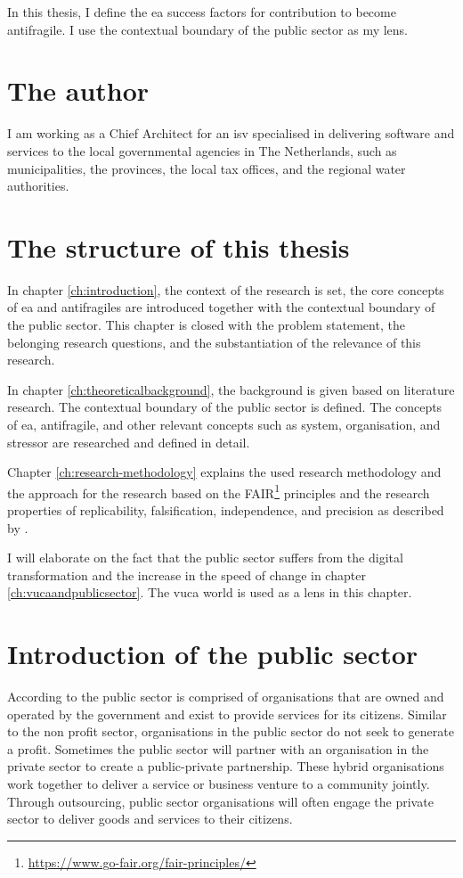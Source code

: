 In this thesis, I define the \acrfull{ea} success factors for contribution to become \gls{antifragile}. I use the contextual boundary of the public sector as my lens.

\section{The author}
\label{sec:context}
I am working as a Chief Architect for an \acrfull{isv} specialised in delivering software and services to the local governmental agencies in The Netherlands, such as municipalities, the provinces, the local tax offices, and the regional water authorities. 

\section{The structure of this thesis}
\label{sec:structure}
In chapter \ref{ch:introduction}, the context of the research is set, the core concepts of \acrshort{ea} and \glspl{antifragile} are introduced together with the contextual boundary of the public sector. This chapter is closed with the problem statement, the belonging research questions, and the substantiation of the relevance of this research.

In chapter \ref{ch:theoreticalbackground}, the background is given based on literature research. The contextual boundary of the public sector is defined. The concepts of \acrshort{ea}, \gls{antifragile}, and other relevant concepts such as system, organisation, and stressor are researched and defined in detail. 

Chapter \ref{ch:research-methodology} explains the used research methodology and the approach for the research based on the FAIR\footnote{\url{https://www.go-fair.org/fair-principles/}} principles and the research properties of replicability, falsification, independence, and precision as described by \textcite{Recker2013}.

I will elaborate on the fact that the public sector suffers from the digital transformation and the increase in the speed of change in chapter \ref{ch:vucaandpublicsector}. The \acrfull{vuca} world \parencite{Bennett2014} is used as a lens in this chapter.

\section{Introduction of the public sector}
\label{sec:intropublicsector}
According to \textcite{PrivacySense2016} the public sector is comprised of organisations that are owned and operated by the government and exist to provide services for its citizens. Similar to the non profit sector, organisations in the public sector do not seek to generate a profit. Sometimes the public sector will partner with an organisation in the private sector to create a public-private partnership. These hybrid organisations work together to deliver a service or business venture to a community jointly. Through outsourcing, public sector organisations will often engage the private sector to deliver goods and services to their citizens.


